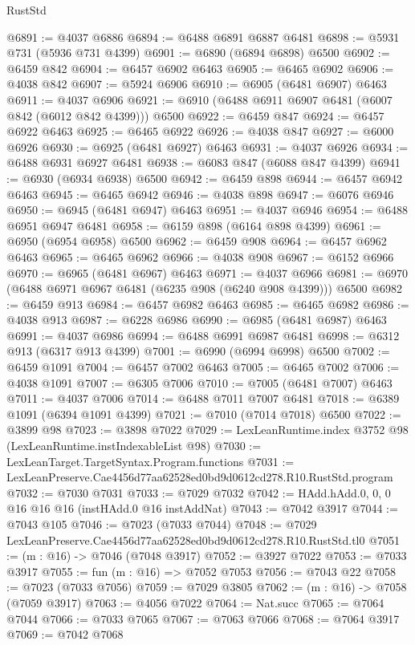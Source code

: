 \begin{lexlean}{RustStd}
\begin{coremodule}
@6891 := @4037 @6886
@6894 := @6488 @6891 @6887 @6481
@6898 := @5931 @731 (@5936 @731 @4399)
@6901 := @6890 (@6894 @6898) @6500
@6902 := @6459 @842
@6904 := @6457 @6902 @6463
@6905 := @6465 @6902
@6906 := @4038 @842
@6907 := @5924 @6906
@6910 := @6905 (@6481 @6907) @6463
@6911 := @4037 @6906
@6921 := @6910 (@6488 @6911 @6907 @6481 (@6007 @842 (@6012 @842 @4399))) @6500
@6922 := @6459 @847
@6924 := @6457 @6922 @6463
@6925 := @6465 @6922
@6926 := @4038 @847
@6927 := @6000 @6926
@6930 := @6925 (@6481 @6927) @6463
@6931 := @4037 @6926
@6934 := @6488 @6931 @6927 @6481
@6938 := @6083 @847 (@6088 @847 @4399)
@6941 := @6930 (@6934 @6938) @6500
@6942 := @6459 @898
@6944 := @6457 @6942 @6463
@6945 := @6465 @6942
@6946 := @4038 @898
@6947 := @6076 @6946
@6950 := @6945 (@6481 @6947) @6463
@6951 := @4037 @6946
@6954 := @6488 @6951 @6947 @6481
@6958 := @6159 @898 (@6164 @898 @4399)
@6961 := @6950 (@6954 @6958) @6500
@6962 := @6459 @908
@6964 := @6457 @6962 @6463
@6965 := @6465 @6962
@6966 := @4038 @908
@6967 := @6152 @6966
@6970 := @6965 (@6481 @6967) @6463
@6971 := @4037 @6966
@6981 := @6970 (@6488 @6971 @6967 @6481 (@6235 @908 (@6240 @908 @4399))) @6500
@6982 := @6459 @913
@6984 := @6457 @6982 @6463
@6985 := @6465 @6982
@6986 := @4038 @913
@6987 := @6228 @6986
@6990 := @6985 (@6481 @6987) @6463
@6991 := @4037 @6986
@6994 := @6488 @6991 @6987 @6481
@6998 := @6312 @913 (@6317 @913 @4399)
@7001 := @6990 (@6994 @6998) @6500
@7002 := @6459 @1091
@7004 := @6457 @7002 @6463
@7005 := @6465 @7002
@7006 := @4038 @1091
@7007 := @6305 @7006
@7010 := @7005 (@6481 @7007) @6463
@7011 := @4037 @7006
@7014 := @6488 @7011 @7007 @6481
@7018 := @6389 @1091 (@6394 @1091 @4399)
@7021 := @7010 (@7014 @7018) @6500
@7022 := @3899 @98
@7023 := @3898 @7022
@7029 := LexLeanRuntime.index @3752 @98 (LexLeanRuntime.instIndexableList @98)
@7030 := LexLeanTarget.TargetSyntax.Program.functions
@7031 := LexLeanPreserve.Cae4456d77aa62528ed0bd9d0612cd278.R10.RustStd.program
@7032 := @7030 @7031
@7033 := @7029 @7032
@7042 := HAdd.hAdd.{0, 0, 0} @16 @16 @16 (instHAdd.{0} @16 instAddNat)
@7043 := @7042 @3917
@7044 := @7043 @105
@7046 := @7023 (@7033 @7044)
@7048 := @7029 LexLeanPreserve.Cae4456d77aa62528ed0bd9d0612cd278.R10.RustStd.tl0
@7051 := (m : @16) -> @7046 (@7048 @3917)
@7052 := @3927 @7022
@7053 := @7033 @3917
@7055 := fun (m : @16) => @7052 @7053
@7056 := @7043 @22
@7058 := @7023 (@7033 @7056)
@7059 := @7029 @3805
@7062 := (m : @16) -> @7058 (@7059 @3917)
@7063 := @4056 @7022
@7064 := Nat.succ
@7065 := @7064 @7044
@7066 := @7033 @7065
@7067 := @7063 @7066
@7068 := @7064 @3917
@7069 := @7042 @7068

\end{coremodule}
\end{lexlean}
